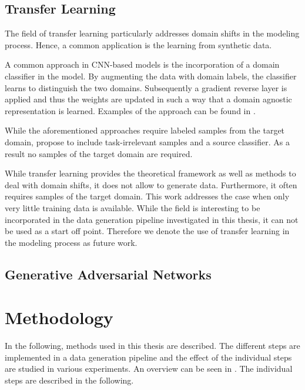 \subsection{Transfer Learning}

The field of transfer learning particularly addresses domain shifts in the modeling process. Hence, a common application is the learning from synthetic data.

A common approach in \ac{CNN}-based models is the incorporation of a domain classifier in the model. By augmenting the data with domain labels, the classifier learns to distinguish the two domains. Subsequently a gradient reverse layer is applied and thus the weights are updated in such a way that a domain agnostic representation is learned. Examples of the approach can be found in \cite{Chen2018c} \cite{Xu2017}.

While the aforementioned approaches require labeled samples from the target domain, \citeauthor{Peng2017} \cite{Peng2017} propose to include task-irrelevant samples and a source classifier. As a result no samples of the target domain are required.

While transfer learning provides the theoretical framework as well as methods to deal with domain shifts, it does not allow to generate data. Furthermore, it often requires samples of the target domain. This work addresses the case when only very little training data is available. While the field is interesting to be incorporated in the data generation pipeline investigated in this thesis, it can not be used as a start off point. Therefore we denote the use of transfer learning in the modeling process as future work.

\subsection{Generative Adversarial Networks}

\cite{Inoue} 

\section{Methodology}
\label{sec:training:meth}

In the following, methods used in this thesis are described. The different steps are implemented in a data generation pipeline and the effect of the individual steps are studied in various experiments. An overview can be seen in  . The individual steps are described in the following.

